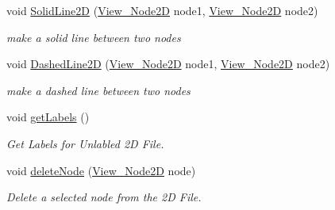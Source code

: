 \begin{DoxyCompactItemize}
\mbox{\label{class_file2_d_a08c97a91d761214d5bf0275570c244e4}} 
void \mbox{\hyperlink{class_file2_d_a08c97a91d761214d5bf0275570c244e4}{Solid\+Line2D}} (\mbox{\hyperlink{class_view___node2_d}{View\+\_\+\+Node2D}} node1, \mbox{\hyperlink{class_view___node2_d}{View\+\_\+\+Node2D}} node2)
\begin{DoxyCompactList}\small\item\em make a solid line between two nodes \end{DoxyCompactList}\item 
\mbox{\label{class_file2_d_a4d0acd53a98b7734047b69597bbf7c2f}} 
void \mbox{\hyperlink{class_file2_d_a4d0acd53a98b7734047b69597bbf7c2f}{Dashed\+Line2D}} (\mbox{\hyperlink{class_view___node2_d}{View\+\_\+\+Node2D}} node1, \mbox{\hyperlink{class_view___node2_d}{View\+\_\+\+Node2D}} node2)
\begin{DoxyCompactList}\small\item\em make a dashed line between two nodes \end{DoxyCompactList}\item 
void \mbox{\hyperlink{class_file2_d_a516073c61faccb01eb4e9312a9653274}{get\+Labels}} ()
\begin{DoxyCompactList}\small\item\em Get Labels for Unlabled 2D File. \end{DoxyCompactList}\item 
\mbox{\label{class_file2_d_a5c99a9f241fcc1877dd18bc5b0d9527a}} 
void \mbox{\hyperlink{class_file2_d_a5c99a9f241fcc1877dd18bc5b0d9527a}{delete\+Node}} (\mbox{\hyperlink{class_view___node2_d}{View\+\_\+\+Node2D}} node)
\begin{DoxyCompactList}\small\item\em Delete a selected node from the 2D File. \end{DoxyCompactList}\end{DoxyCompactItemize}
